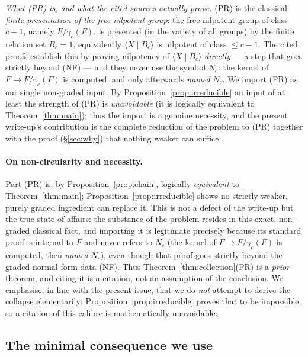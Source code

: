 \documentclass{amsart}
\theoremstyle{definition}
\theoremstyle{remark}
\begin{document}
\emph{What (PR) is, and what the cited sources actually prove.} (PR) is the classical
\emph{finite presentation of the free nilpotent group}: the free nilpotent group of class
$c-1$, namely $F/\gamma_c(F)$, is presented \textup{(}in the variety of all groups\textup{)}
by the finite relation set $B_c=1$, equivalently $\langle X\mid B_c\rangle$ is nilpotent of
class $\le c-1$. The cited proofs establish this by proving nilpotency of
$\langle X\mid B_c\rangle$ \emph{directly} --- a step that goes strictly beyond (NF) --- and
they never use the symbol $N_c$: the kernel of $F\to F/\gamma_c(F)$ is computed, and only
afterwards \emph{named} $N_c$. We import (PR) as our single non-graded input. By
Proposition~\ref{prop:irreducible} an input of at least the strength of (PR) is
\emph{unavoidable} (it is logically equivalent to Theorem~\ref{thm:main}); thus the import is
a genuine necessity, and the present write-up's contribution is the complete reduction of the
problem to (PR) together with the proof (\S\ref{sec:why}) that nothing weaker can suffice.

\paragraph{On non-circularity and necessity.} Part (PR) is, by Proposition~\ref{prop:chain},
logically \emph{equivalent} to Theorem~\ref{thm:main}; Proposition~\ref{prop:irreducible} shows
no strictly weaker, purely graded ingredient can replace it. This is not a defect of the
write-up but the true state of affairs: the substance of the problem resides in this exact,
non-graded classical fact, and importing it is legitimate precisely because its standard proof
is internal to $F$ and never refers to $N_c$ (the kernel of $F\to F/\gamma_c(F)$ is computed,
then \emph{named} $N_c$), even though that proof goes strictly beyond the graded normal-form
data (NF). Thus Theorem~\ref{thm:collection}(PR) is a \emph{prior} theorem, and citing it is a
citation, not an assumption of the conclusion. We
emphasise, in line with the present issue, that we do \emph{not} attempt to derive the collapse
elementarily: Proposition~\ref{prop:irreducible} proves that to be impossible, so a citation of
this calibre is mathematically unavoidable.

\subsection*{The minimal consequence we use}
\end{document}
